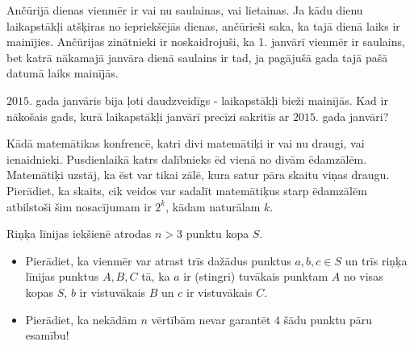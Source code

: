 

%



\renewcommand{\theenumi}{\alph{enumi}}



\noindent
 
\filbreak


\begin{problem}


Ančūrijā dienas vienmēr ir vai nu saulainas, vai lietainas. Ja kādu dienu laikapstākļi atšķiras no iepriekšējās dienas, ančūrieši saka, ka tajā dienā laiks ir mainījies. Ančūrijas zinātnieki ir noskaidrojuši, ka 1. janvārī vienmēr ir saulains, bet katrā nākamajā janvāra dienā saulains ir tad, ja pagājušā gada tajā pašā datumā laiks mainījās.

$2015.$ gada janvāris bija ļoti daudzveidīgs - laikapstākļi bieži mainījās. Kad ir nākošais gads, kurā laikapstākļi janvārī precīzi sakritīs ar $2015.$ gada janvāri?

\end{problem}

\begin{problem}


Kādā matemātikas konfrencē, katri divi matemātiķi ir vai nu draugi, vai ienaidnieki. Pusdienlaikā katrs dalībnieks ēd vienā no divām ēdamzālēm. Matemātiķi uzstāj, ka ēst var tikai zālē, kura satur pāra skaitu viņas draugu. Pierādiet, ka skaits, cik veidos var sadalīt matemātiķus starp ēdamzālēm atbilstoši šim nosacījumam ir $2^k$, kādam naturālam $k$.


\end{problem}



\begin{problem}




Riņķa līnijas iekšienē atrodas $n>3$ punktu kopa $S$.
\begin {itemize}
\item Pierādiet, ka vienmēr var atrast trīs dažādus punktus $a,b,c \in S$ un trīs riņķa līnijas punktus $A,B,C$ tā, ka $a$ ir (stingri) tuvākais punktam $A$ no visas kopas $S$, $b$ ir vistuvākais $B$ un $c$ ir vistuvākais $C$. 
\item Pierādiet, ka nekādām $n$ vērtībām nevar garantēt $4$ šādu punktu pāru esamību! 
\end {itemize}
\end{problem}



%

